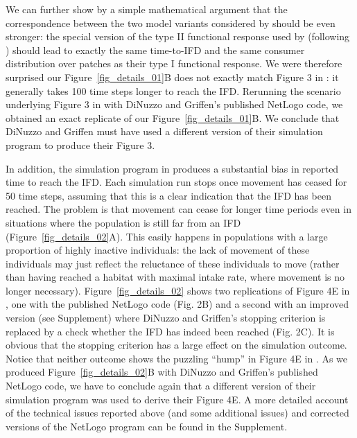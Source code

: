\begin{refsection}
	We can further show by a simple mathematical argument that the correspondence between the two model variants considered by \citeauthor{dinuzzo2020} should be even stronger: the special version of the type II functional response used by \citeauthor{dinuzzo2020} (following \citeauthor{abrams2000}) should lead to exactly the same time-to-IFD and the same consumer distribution over patches as their type I functional response.
	We were therefore surprised our Figure~\ref{fig_details_01}B does not exactly match Figure 3 in \citep{dinuzzo2020}: it generally takes 100 time steps longer to reach the IFD.
	Rerunning the scenario underlying Figure 3 in \citep{dinuzzo2020} with DiNuzzo and Griffen's published NetLogo code, we obtained an exact replicate of our Figure~\ref{fig_details_01}B.
	We conclude that DiNuzzo and Griffen must have used a different version of their simulation program to produce their Figure 3.

	In addition, the simulation program in \citep{dinuzzo2020} produces a substantial bias in reported time to reach the IFD.
	Each simulation run stops once movement has ceased for 50 time steps, assuming that this is a clear indication that the IFD has been reached.
	The problem is that movement can cease for longer time periods even in situations where the population is still far from an IFD (Figure~\ref{fig_details_02}A).
	This easily happens in populations with a large proportion of highly inactive individuals: the lack of movement of these individuals may just reflect the reluctance of these individuals to move (rather than having reached a habitat with maximal intake rate, where movement is no longer necessary).
	Figure~\ref{fig_details_02} shows two replications of Figure 4E in \citep{dinuzzo2020}, one with the published NetLogo code (Fig. 2B) and a second with an improved version (see Supplement) where DiNuzzo and Griffen's stopping criterion is replaced by a check whether the IFD has indeed been reached (Fig. 2C).
	It is obvious that the stopping criterion has a large effect on the simulation outcome.
	Notice that neither outcome shows the puzzling ``hump'' in Figure 4E in \citep{dinuzzo2020}.
	As we produced Figure~\ref{fig_details_02}B with DiNuzzo and Griffen's published NetLogo code, we have to conclude again that a different version of their simulation program was used to derive their Figure 4E.
	A more detailed account of the technical issues reported above (and some additional issues) and corrected versions of the NetLogo program can be found in the Supplement.


\end{refsection}
